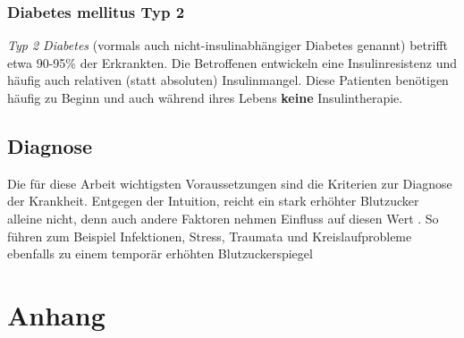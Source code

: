 \documentclass[11.5pt]{article}
\begin{document}
\subsubsection{Diabetes mellitus Typ 2}


\textit{Typ 2 Diabetes} (vormals auch \glqq nicht-insulinabhängiger Diabetes genannt\grqq{}) betrifft etwa 90-95\% der Erkrankten. Die Betroffenen entwickeln eine Insulinresistenz und häufig auch relativen (statt absoluten) Insulinmangel. Diese Patienten benötigen häufig zu Beginn und auch während ihres Lebens \textbf{keine} Insulintherapie. \cite[p.~63]{ada}

\newpage

\subsection{Diagnose}


Die für diese Arbeit wichtigsten Voraussetzungen sind die Kriterien zur Diagnose der Krankheit. Entgegen der Intuition, reicht ein stark erhöhter Blutzucker alleine nicht, denn auch andere Faktoren nehmen Einfluss auf diesen Wert \cite[p.~540]{who}. So führen zum Beispiel Infektionen, Stress, Traumata und Kreislaufprobleme ebenfalls zu einem temporär erhöhten Blutzuckerspiegel \cite[p.~540]{who}


\newpage

\appendix
\section{Anhang}


\newpage

\printbibliography
\end{document}
